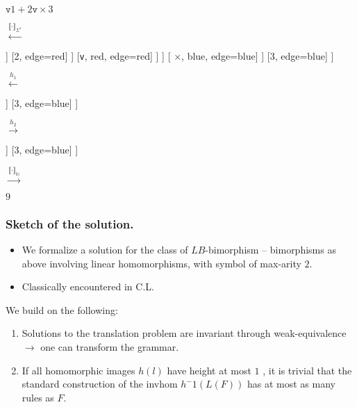 \documentclass{beamer}
\begin{document}
\begin{frame}
\begin{center}
      \fontsize{6}{7}      
      \begin{minipage}{0.1\linewidth}
        $\texttt{v} 1 + 2\texttt{v} \times 3$
      \end{minipage}
    $\xleftarrow{\llbracket \cdot \rrbracket_{\Sigma^{\ast}}}$
    \begin{minipage}{0.18\linewidth}
	      \centering
	      \begin{forest}
      	      [$\cdot$, blue [$\cdot$, blue, edge=blue [ $\cdot$, red, edge=blue [ \texttt{v}, red, edge=red ] [$\cdot$, red, edge=red [$\cdot$, red, edge=red [$\cdot$, red, edge=red [1, edge=red] [+, red, edge=red]] [2, edge=red] ] [\texttt{v}, red, edge=red] ]  ] [ $\times$, blue, edge=blue] ] [3, edge=blue] ]
           \end{forest}
      \end{minipage}
      $\xleftarrow{h_1}$      
	  \begin{minipage}{0.1\linewidth}
		  \centering
		  \begin{forest}
		    [$r_{m}$, blue [ $r_{a}$, red, edge=blue [$1$, edge=red] [$2$, edge=red] ] [$3$, edge=blue] ] 
		  \end{forest}
	  \end{minipage}
      $\xrightarrow{h_2}$
      \begin{minipage}{0.18\linewidth}
      	\centering
      	\begin{forest}
      		[\texttt{mul}, blue [ \texttt{add},red, edge=blue [$1$, edge=red] [$2$, edge=red] ]  [$3$, edge=blue] ]
      	\end{forest}
      \end{minipage}
      $\xrightarrow{\llbracket \cdot \rrbracket_{\mathbb{N}}}$
      \begin{minipage}{0.05\linewidth}
      	\centering
      	$9$
      \end{minipage}
    \end{center}
\end{frame}

\begin{frame}
  \frametitle{Sketch of the solution.}
  \begin{itemize}
  \item We formalize a solution for the class of $LB$-bimorphism -- bimorphisms as above involving linear homomorphisms, with symbol of max-arity $2$.
  \item Classically encountered in C.L.
  \end{itemize}

  
  We build on the following:
  \begin{enumerate}
  \item Solutions to the translation problem are invariant through weak-equivalence $\rightarrow$ one can transform the grammar.
  \item If all homomorphic images $h(l)$ have height at most $1$ , it is trivial that the standard construction of the invhom $h^-1(L(F))$ has at most as many rules as $F$.
  \end{enumerate}
\end{frame}
\end{document}
